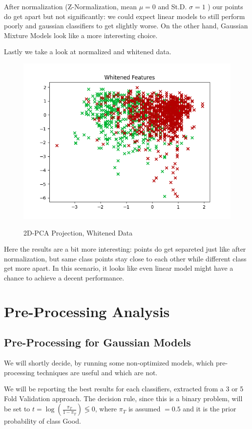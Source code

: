 \documentclass[twocolumn]{article}
\begin{document}
After normalization (Z-Normalization, mean $\mu = 0$ and St.D. $\sigma = 1$ ) our points do get apart but not significantly: we could expect linear models to still perform poorly and gaussian classifiers to get slightly worse. On the other hand, Gaussian Mixture Models look like a more interesting choice.

Lastly we take a look at normalized and whitened data.

\begin{figure}[H]
    \caption{2D-PCA Projection, Whitened Data}
    {\includegraphics[width=\linewidth]{2DWhitened.png}}
    \label{2DWHI}
\end{figure}

Here the results are a bit more interesting: points do get separeted just like after normalization, but same class points stay close to each other while different class get more apart. In this scenario, it looks like even linear model might have a chance to achieve a decent performance.

\newpage
\section{Pre-Processing Analysis}
\subsection{Pre-Processing for Gaussian Models}

We will shortly decide, by running some non-optimized models, which pre-processing techniques are useful and which are not. 

We will be reporting the best results for each classifiers, extracted from a 3 or 5 Fold Validation approach. The decision rule, since this is a binary problem, will be set to $\displaystyle t = \log(\frac{\pi_T}{1-\pi_T}) \lessgtr 0 $, where $\pi_T$ is assumed $ = 0.5$ and it is the prior probability of class Good.
\end{document}
